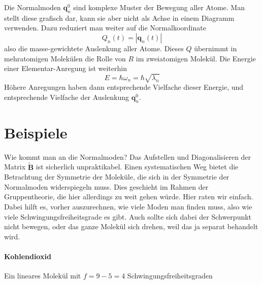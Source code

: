 Die Normalmoden $\mathbf{q}_n^0$ sind komplexe Muster der Bewegung aller Atome. Man stellt diese grafisch dar, kann sie aber nicht als Achse in einem Diagramm verwenden. Dazu reduziert man weiter auf die Normalkoordinate
\begin{equation}
Q_n(t) = | \mathbf{q}_n (t) |
\end{equation}
also die masse-gewichtete Auslenkung aller Atome. Dieses $Q$ übernimmt in mehratomigen Molekülen die Rolle von $R$ im zweiatomigen Molekül. Die Energie einer Elementar-Anregung ist weiterhin 
\begin{equation}
E = \hbar \omega_n = \hbar	\sqrt{\lambda_n}
\end{equation}
Höhere Anregungen haben dann entsprechende Vielfache dieser Energie, und entsprechende Vielfache der Auslenkung 
 $\mathbf{q}_n^0$.


\section{Beispiele}

Wie kommt man an die Normalmoden? Das Aufstellen und Diagonalisieren der Matrix  $\tilde{\mathbf{B}} $ ist sicherlich unpraktikabel. Einen systematischen Weg bietet die Betrachtung der Symmetrie der Moleküle, die sich in der Symmetrie der Normalmoden widerspiegeln muss. Dies geschieht im Rahmen der Gruppentheorie, die hier allerdings zu weit gehen würde. Hier raten wir einfach. Dabei hilft es, vorher auszurechnen, wie viele Moden man finden muss, also wie viele Schwingungsfreiheitsgrade es gibt. Auch sollte sich dabei der Schwerpunkt nicht bewegen, oder das ganze Molekül sich drehen, weil das ja separat behandelt wird.

\paragraph{Kohlendioxid} 
Ein lineares Molekül mit $f=9 - 5 = 4$ Schwingungsfreiheitsgraden



